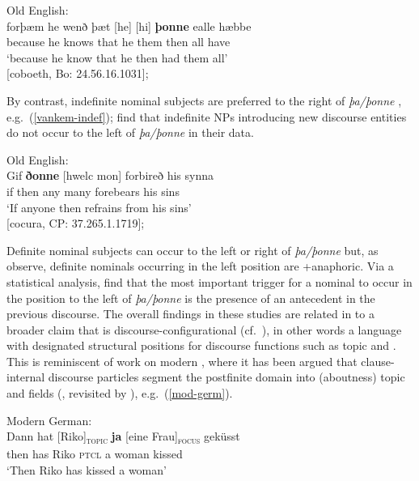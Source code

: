 \documentclass[output=paper,colorlinks,citecolor=brown]{langscibook}
\begin{document}
\ea  \label{vankem-pro} Old English:\\
\gll forþæm he wenð þæt [he] [hi] \textbf{þonne} ealle hæbbe\\
because he knows that he them then all have\\
\glt `because he know that he then had them all' \\ \hfill [coboeth, Bo: 24.56.16.1031]; \citep[12]{vanKem2008balance}
\z 


By contrast, indefinite nominal subjects are preferred to the right of \textit{þa/þonne} \citep[237]{vanKem-Los2006}, e.g.~(\ref{vankem-indef}); \citet[13]{vanKem2008balance} find that indefinite NPs introducing new discourse entities do not occur to the left of \textit{þa/þonne} in their data.

\ea \label{vankem-indef} Old English: \\
\gll Gif \textbf{ðonne} [hwelc mon] forbireð his synna\\
if then any many forebears his sins\\
\glt `If anyone then refrains from his sins' \\ \hfill [cocura, CP: 37.265.1.1719]; \citep[13]{vanKem2008balance}
\z 

\noindent Definite nominal subjects can occur to the left or right of \textit{þa/þonne} but, as \citet[13]{vanKem2008balance} observe, definite nominals occurring in the left position are +anaphoric. Via a statistical analysis, \citet[19]{vanKem2008balance} find that the most important trigger for a nominal to occur in the position to the left of \textit{þa/þonne} is the presence of an antecedent in the previous discourse. The overall findings in these studies are related in \citet[233]{vanKem-Los2006} to a broader claim that  is discourse-configurational (cf.~\citealp{Kiss1995discourse}), in other words a language with designated structural positions for discourse functions such as topic and . This is reminiscent of work on modern , where it has been argued that clause-internal discourse particles segment the postfinite domain into (aboutness) topic and  fields (\citealp{krivonosov1977deutsche}, revisited by \citealp{grosz2016information}), e.g.~(\ref{mod-germ}).


\ea 
\label{mod-germ} Modern German: \\
\gll  Dann hat [Riko]\textsubscript{\textsc{topic}} \textbf{ja} [eine Frau]\textsubscript{\textsc{focus}} geküsst\\
then has Riko \textsc{ptcl} a woman kissed\\
\glt `Then Riko has kissed a woman' \hfill \citep[338]{grosz2016information}
\z 
\end{document}
